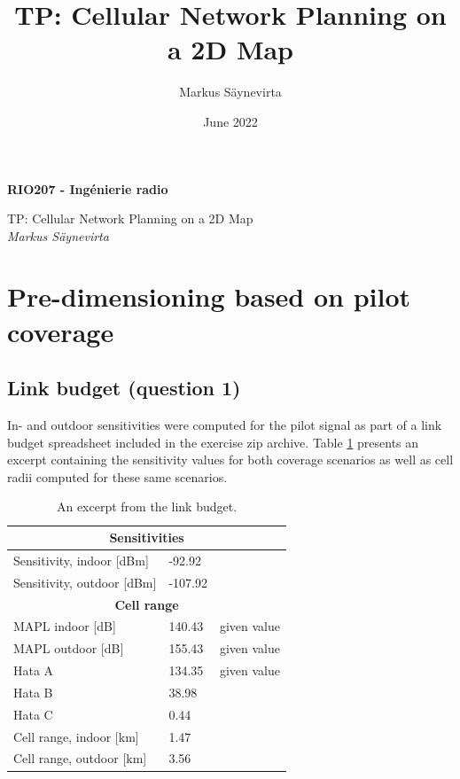 \documentclass{article}
\title{TP: Cellular Network Planning on a 2D Map}
\author{Markus Säynevirta}
\date{June 2022}
\begin{document}
\thispagestyle{plain}

\large
\textbf{RIO207 - Ingénierie radio}

\large
TP: Cellular Network Planning on a 2D Map\\
\textit{Markus Säynevirta}
\vspace{0.5cm}

\section{Pre-dimensioning based on pilot coverage}
\subsection{Link budget (question 1)}

In- and outdoor sensitivities were computed for the pilot signal as part of a link budget spreadsheet included in the exercise zip archive. Table \ref{tab:link_budget} presents an excerpt containing the sensitivity values for both coverage scenarios as well as cell radii computed for these same scenarios.

\begin{table}[!htb]
    \centering
    \begin{tabular}{|l|l|l|}
    \hline
    \multicolumn{3}{|c|}{\textbf{Sensitivities}} \\ \hline
    Sensitivity, indoor {[}dBm{]}          & -92.92  &                                       \\ \hline
    Sensitivity, outdoor {[}dBm{]}         & -107.92 &                                       \\ \hline
    \multicolumn{3}{|c|}{\textbf{Cell range}} \\ \hline
    MAPL indoor {[}dB{]}                   & 140.43  & given value                           \\ \hline
    MAPL outdoor {[}dB{]}                  & 155.43  & given value                           \\ \hline
    Hata A                                 & 134.35  & given value                           \\ \hline
    Hata B                                 & 38.98   &                                       \\ \hline
    Hata C                                 & 0.44    &                                       \\ \hline
    Cell range, indoor {[}km{]}            & 1.47    &                                       \\ \hline
    Cell range, outdoor {[}km{]}           & 3.56    &                                       \\ \hline
    \end{tabular}
\caption{An excerpt from the link budget.}
\label{tab:link_budget}
\end{table}
\end{document}
